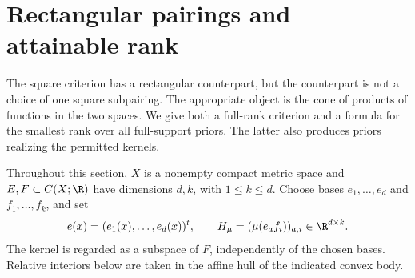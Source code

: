\section{Rectangular pairings and attainable rank}
\label{sec:v19-rectangular}
The square criterion has a rectangular counterpart, but the counterpart
is not a choice of one square subpairing. The appropriate object is
the cone of products of functions in the two spaces. We give both a
full-rank criterion and a formula for the smallest rank over all
full-support priors. The latter also produces priors realizing the
permitted kernels.

Throughout this section, $X$ is a nonempty compact metric space and
$E,F\subset C(X;\R)$ have dimensions $d,k$, with $1\le k\le d$.
Choose bases $e_1,\ldots,e_d$ and $f_1,\ldots,f_k$, and set
\[
 e(x)=(e_1(x),\ldots,e_d(x))^t,\qquad
 H_\mu=(\mu(e_a f_i))_{a,i}\in\R^{d\times k}.
\]
The kernel is regarded as a subspace of $F$, independently of the chosen
bases. Relative interiors below are taken in the affine hull of the
indicated convex body.

